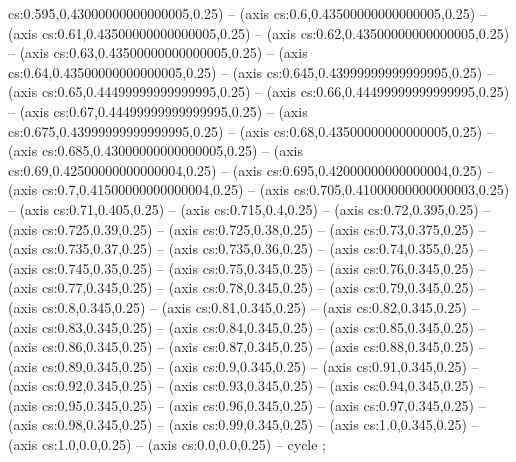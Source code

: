 cs:0.595,0.43000000000000005,0.25) -- (axis cs:0.6,0.43500000000000005,0.25) -- (axis cs:0.61,0.43500000000000005,0.25) -- (axis cs:0.62,0.43500000000000005,0.25) -- (axis cs:0.63,0.43500000000000005,0.25) -- (axis cs:0.64,0.43500000000000005,0.25) -- (axis cs:0.645,0.43999999999999995,0.25) -- (axis cs:0.65,0.44499999999999995,0.25) -- (axis cs:0.66,0.44499999999999995,0.25) -- (axis cs:0.67,0.44499999999999995,0.25) -- (axis cs:0.675,0.43999999999999995,0.25) -- (axis cs:0.68,0.43500000000000005,0.25) -- (axis cs:0.685,0.43000000000000005,0.25) -- (axis cs:0.69,0.42500000000000004,0.25) -- (axis cs:0.695,0.42000000000000004,0.25) -- (axis cs:0.7,0.41500000000000004,0.25) -- (axis cs:0.705,0.41000000000000003,0.25) -- (axis cs:0.71,0.405,0.25) -- (axis cs:0.715,0.4,0.25) -- (axis cs:0.72,0.395,0.25) -- (axis cs:0.725,0.39,0.25) -- (axis cs:0.725,0.38,0.25) -- (axis cs:0.73,0.375,0.25) -- (axis cs:0.735,0.37,0.25) -- (axis cs:0.735,0.36,0.25) -- (axis cs:0.74,0.355,0.25) -- (axis cs:0.745,0.35,0.25) -- (axis cs:0.75,0.345,0.25) -- (axis cs:0.76,0.345,0.25) -- (axis cs:0.77,0.345,0.25) -- (axis cs:0.78,0.345,0.25) -- (axis cs:0.79,0.345,0.25) -- (axis cs:0.8,0.345,0.25) -- (axis cs:0.81,0.345,0.25) -- (axis cs:0.82,0.345,0.25) -- (axis cs:0.83,0.345,0.25) -- (axis cs:0.84,0.345,0.25) -- (axis cs:0.85,0.345,0.25) -- (axis cs:0.86,0.345,0.25) -- (axis cs:0.87,0.345,0.25) -- (axis cs:0.88,0.345,0.25) -- (axis cs:0.89,0.345,0.25) -- (axis cs:0.9,0.345,0.25) -- (axis cs:0.91,0.345,0.25) -- (axis cs:0.92,0.345,0.25) -- (axis cs:0.93,0.345,0.25) -- (axis cs:0.94,0.345,0.25) -- (axis cs:0.95,0.345,0.25) -- (axis cs:0.96,0.345,0.25) -- (axis cs:0.97,0.345,0.25) -- (axis cs:0.98,0.345,0.25) -- (axis cs:0.99,0.345,0.25) -- (axis cs:1.0,0.345,0.25) -- (axis cs:1.0,0.0,0.25) -- (axis cs:0.0,0.0,0.25) -- cycle
;
